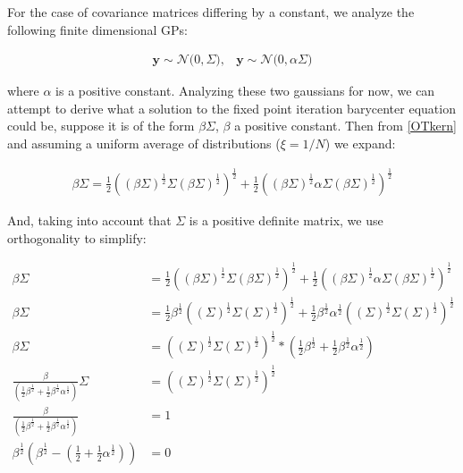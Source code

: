 \documentclass[12pt]{article}
\begin{document}
For the case of covariance matrices differing by a constant, we analyze the following finite dimensional GPs:

\begin{align}
    \textbf{y} \sim \mathcal{N} \big(0, \Sigma \big), &
    \textbf{y} \sim \mathcal{N} \big(0, \alpha \Sigma \big)
\end{align}

where $\alpha$ is a positive constant. Analyzing these two gaussians for now, we can attempt to derive what a solution to the
fixed point iteration barycenter equation could be, suppose it is of the form $\beta \Sigma$, $\beta$ a positive constant. Then
from \ref{OTkern} and assuming a uniform average of distributions ($\xi = 1/N$) we expand:

\begin{align}
    \beta \Sigma = \frac{1}{2} ((\beta \Sigma)^{\frac{1}{2}}  \Sigma (\beta \Sigma)^{\frac{1}{2}})^{\frac{1}{2}} +
    \frac{1}{2} ((\beta \Sigma)^{\frac{1}{2}} \alpha \Sigma (\beta \Sigma)^{\frac{1}{2}})^{\frac{1}{2}}
\end{align}

And, taking into account that $\Sigma$ is a positive definite matrix, we use orthogonality to simplify:

\begin{align}
    \beta \Sigma &= \frac{1}{2} ((\beta \Sigma)^{\frac{1}{2}}  \Sigma (\beta \Sigma)^{\frac{1}{2}})^{\frac{1}{2}} +
    \frac{1}{2} ((\beta \Sigma)^{\frac{1}{2}} \alpha \Sigma (\beta \Sigma)^{\frac{1}{2}})^{\frac{1}{2}} \\
    \beta \Sigma &= \frac{1}{2} \beta^{\frac{1}{2}}((\Sigma)^{\frac{1}{2}}  \Sigma (\Sigma)^{\frac{1}{2}})^{\frac{1}{2}} +
    \frac{1}{2} \beta^{\frac{1}{2}} \alpha^{\frac{1}{2}} ((\Sigma)^{\frac{1}{2}} \Sigma (\Sigma)^{\frac{1}{2}})^{\frac{1}{2}} \\
    \beta \Sigma &= ((\Sigma)^{\frac{1}{2}}  \Sigma (\Sigma)^{\frac{1}{2}})^{\frac{1}{2}} * (\frac{1}{2} \beta^{\frac{1}{2}} +
    \frac{1}{2} \beta^{\frac{1}{2}} \alpha^{\frac{1}{2}}) \\
    \frac{\beta}{(\frac{1}{2} \beta^{\frac{1}{2}} + \frac{1}{2} \beta^{\frac{1}{2}} \alpha^{\frac{1}{2}})} \Sigma &=
    ((\Sigma)^{\frac{1}{2}}  \Sigma (\Sigma)^{\frac{1}{2}})^{\frac{1}{2}} \\
    \frac{\beta}{(\frac{1}{2} \beta^{\frac{1}{2}} + \frac{1}{2} \beta^{\frac{1}{2}} \alpha^{\frac{1}{2}})} &= 1 \\
    \beta^{\frac{1}{2}} (\beta^{\frac{1}{2}} - (\frac{1}{2} + \frac{1}{2} \alpha^{\frac{1}{2}})) &= 0 \\
\end{align}
\end{document}
